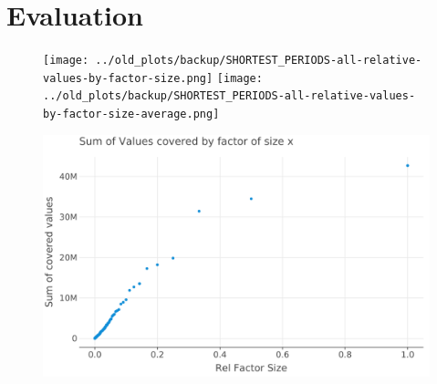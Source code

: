 
\chapter{Evaluation}
\label{ch:Evaluation}
\begin{figure}[h]
	\texttt{[image: ../old\_plots/backup/SHORTEST\_PERIODS-all-relative-values-by-factor-size.png]}
	\texttt{[image: ../old\_plots/backup/SHORTEST\_PERIODS-all-relative-values-by-factor-size-average.png]}
\end{figure}
\begin{figure}
	\includegraphics[width=\linewidth]{../plots/GREEDY_SHORT_FACTORS-all-values-by-factor-size.png}
\end{figure}


